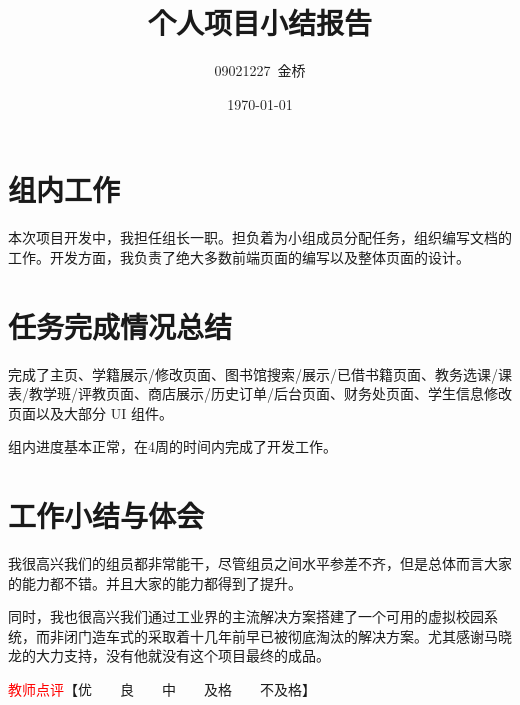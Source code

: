 \documentclass{article}
\title{个人项目小结报告}
\author{09021227~金桥}
\date{\today}
\begin{document}
\maketitle

\section{组内工作}

本次项目开发中，我担任组长一职。担负着为小组成员分配任务，组织编写文档的工作。开发方面，我负责了绝大多数前端页面的编写以及整体页面的设计。

\section{任务完成情况总结}

完成了主页、学籍展示/修改页面、图书馆搜索/展示/已借书籍页面、教务选课/课表/教学班/评教页面、商店展示/历史订单/后台页面、财务处页面、学生信息修改页面以及大部分 UI 组件。

组内进度基本正常，在4周的时间内完成了开发工作。

\section{工作小结与体会}

我很高兴我们的组员都非常能干，尽管组员之间水平参差不齐，但是总体而言大家的能力都不错。并且大家的能力都得到了提升。

同时，我也很高兴我们通过工业界的主流解决方案搭建了一个可用的虚拟校园系统，而非闭门造车式的采取着十几年前早已被彻底淘汰的解决方案。尤其感谢马晓龙的大力支持，没有他就没有这个项目最终的成品。

\vfill
\noindent\textcolor{red}{教师点评}【优~~~~良~~~~中~~~~及格~~~~不及格】
\end{document}
